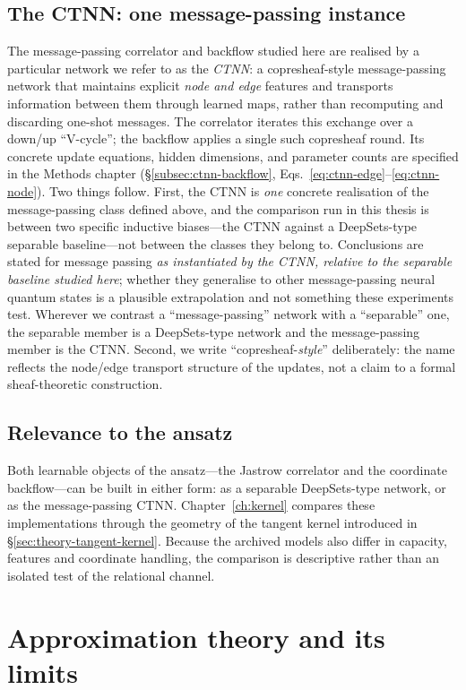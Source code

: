 \subsection{The CTNN: one message-passing instance}
\label{sec:ctnn-theory}
The message-passing correlator and backflow studied here are realised by a particular
network we refer to as the \emph{CTNN}: a copresheaf-style message-passing network that
maintains explicit \emph{node and edge} features and transports information between them
through learned maps, rather than recomputing and discarding one-shot messages. The
correlator iterates this exchange over a down/up ``V-cycle''; the backflow applies a
single such copresheaf round. Its concrete update equations, hidden dimensions, and
parameter counts are specified in the Methods chapter
(\S\ref{subsec:ctnn-backflow}, Eqs.~\eqref{eq:ctnn-edge}--\eqref{eq:ctnn-node}). Two things follow. First, the CTNN is \emph{one} concrete realisation of
the message-passing class defined above, and the comparison run in this thesis is between two
specific inductive biases---the CTNN against a DeepSets-type separable baseline---not between
the classes they belong to. Conclusions are stated for message passing \emph{as instantiated
by the CTNN, relative to the separable baseline studied here}; whether they generalise to
other message-passing neural quantum states is a plausible extrapolation and not something
these experiments test. Wherever we
contrast a ``message-passing'' network with a ``separable'' one, the separable member is
a DeepSets-type network and the message-passing member is the CTNN. Second, we write
``copresheaf-\emph{style}'' deliberately: the name reflects the node/edge transport
structure of the updates, not a claim to a formal sheaf-theoretic construction.

\subsection{Relevance to the ansatz}
Both learnable objects of the ansatz---the Jastrow correlator and the coordinate
backflow---can be built in either form: as a separable DeepSets-type network, or as the
message-passing CTNN. Chapter~\ref{ch:kernel} compares these implementations through the
geometry of the tangent kernel introduced in \S\ref{sec:theory-tangent-kernel}. Because the
archived models also differ in capacity, features and coordinate handling, the comparison
is descriptive rather than an isolated test of the relational channel.

\section{Approximation theory and its limits}
\label{sec:nn_approximation}

